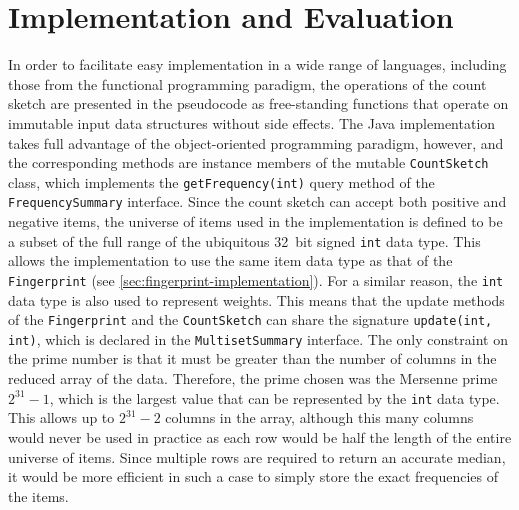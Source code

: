 \section{Implementation and Evaluation}
\label{sec:count-sketch-implementation}

In order to facilitate easy implementation in a wide range of languages, including those from the functional programming paradigm, the operations of the count sketch are presented in the pseudocode as free-standing functions that operate on immutable input data structures without side effects.
The Java implementation takes full advantage of the object-oriented programming paradigm, however, and the corresponding methods are instance members of the mutable \lstinline{CountSketch} class, which implements the \lstinline{getFrequency(int)} query method of the \lstinline{FrequencySummary} interface.
Since the count sketch can accept both positive and negative items, the universe of items used in the implementation is defined to be a subset of the full range of the ubiquitous \num{32}~bit signed \lstinline{int} data type.
This allows the implementation to use the same item data type as that of the \lstinline{Fingerprint} (see \cref{sec:fingerprint-implementation}).
For a similar reason, the \lstinline{int} data type is also used to represent weights.
This means that the update methods of the \lstinline{Fingerprint} and the \lstinline{CountSketch} can share the signature \lstinline{update(int, int)}, which is declared in the \lstinline{MultisetSummary} interface.
The only constraint on the prime number is that it must be greater than the number of columns in the reduced array of the data.
Therefore, the prime chosen was the Mersenne prime \( 2^{31} - 1 \), which is the largest value that can be represented by the \lstinline{int} data type.
This allows up to \( 2^{31} - 2 \) columns in the array, although this many columns would never be used in practice as each row would be half the length of the entire universe of items.
Since multiple rows are required to return an accurate median, it would be more efficient in such a case to simply store the exact frequencies of the items.

